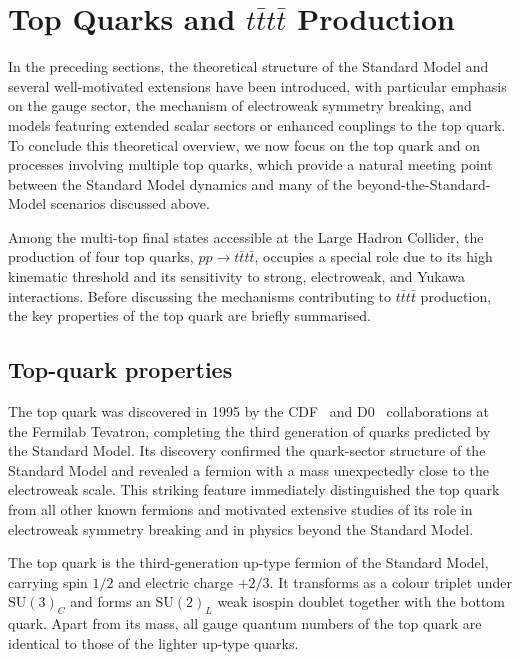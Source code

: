 \section{Top Quarks and $t\bar{t}t\bar{t}$ Production}
\label{sec:four-tops}

In the preceding sections, the theoretical structure of the Standard Model and several well-motivated extensions
have been introduced, with particular emphasis on the gauge sector, the mechanism of electroweak symmetry breaking,
and models featuring extended scalar sectors or enhanced couplings to the top quark.
To conclude this theoretical overview, we now focus on the top quark and on processes involving multiple top quarks,
which provide a natural meeting point between the Standard Model dynamics and many of the beyond-the-Standard-Model
scenarios discussed above.

Among the multi-top final states accessible at the Large Hadron Collider,
the production of four top quarks,
$pp \to t\bar{t}t\bar{t}$,
occupies a special role due to its high kinematic threshold and its sensitivity to strong, electroweak,
and Yukawa interactions.
Before discussing the mechanisms contributing to $t\bar{t}t\bar{t}$ production,
the key properties of the top quark are briefly summarised.

\subsection{Top-quark properties}
\label{subsec:top_properties}

The top quark was discovered in 1995 by the CDF~\cite{CDF1995} and D0~\cite{D01995} collaborations at the Fermilab Tevatron,
completing the third generation of quarks predicted by the Standard Model.
Its discovery confirmed the quark-sector structure of the Standard Model
and revealed a fermion with a mass unexpectedly close to the electroweak scale.
This striking feature immediately distinguished the top quark from all other known fermions
and motivated extensive studies of its role in electroweak symmetry breaking
and in physics beyond the Standard Model.

The top quark is the third-generation up-type fermion of the Standard Model,
carrying spin $1/2$ and electric charge $+2/3$.
It transforms as a colour triplet under $\mathrm{SU}(3)_C$
and forms an $\mathrm{SU}(2)_L$ weak isospin doublet together with the bottom quark.
Apart from its mass, all gauge quantum numbers of the top quark
are identical to those of the lighter up-type quarks.

